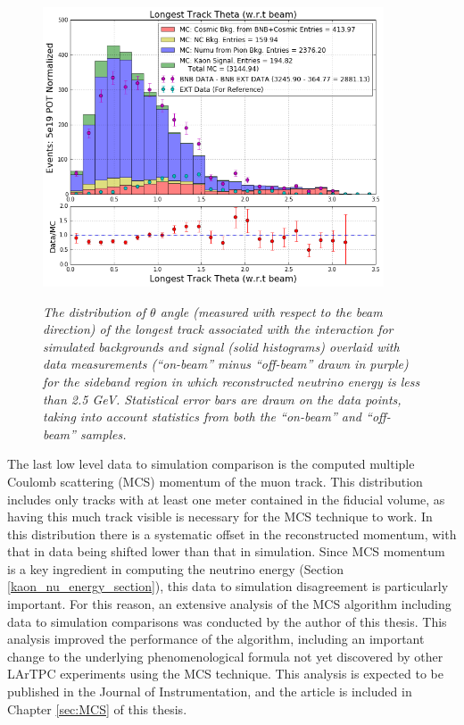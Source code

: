 \begin{figure}[ht!]
\centering
	\includegraphics[width=0.9\textwidth]{Figures/kaon_sideband_comp_theta.png} \\
\caption{\textit{The distribution of $\theta$ angle (measured with respect to the beam direction) of the longest track associated with the interaction for simulated backgrounds and signal (solid histograms) overlaid with data measurements (``on-beam'' minus ``off-beam'' drawn in purple) for the sideband region in which reconstructed neutrino energy is less than 2.5 GeV. Statistical error bars are drawn on the data points, taking into account statistics from both the ``on-beam'' and ``off-beam'' samples.}}\label{kaon_sideband_comp_theta}
\end{figure}

The last low level data to simulation comparison is the computed multiple Coulomb scattering (MCS) momentum of the muon track. This distribution includes only tracks with at least one meter contained in the fiducial volume, as having this much track visible is necessary for the MCS technique to work. In this distribution there is a systematic offset in the reconstructed momentum, with that in data being shifted lower than that in simulation. Since MCS momentum is a key ingredient in computing the neutrino energy (Section \ref{kaon_nu_energy_section}), this data to simulation disagreement is particularly important. For this reason, an extensive analysis of the MCS algorithm including data to simulation comparisons was conducted by the author of this thesis. This analysis improved the performance of the algorithm, including an important change to the underlying phenomenological formula not yet discovered by other LArTPC experiments using the MCS technique. This analysis is expected to be published in the Journal of Instrumentation, and the article is included in Chapter \ref{sec:MCS} of this thesis.\\

